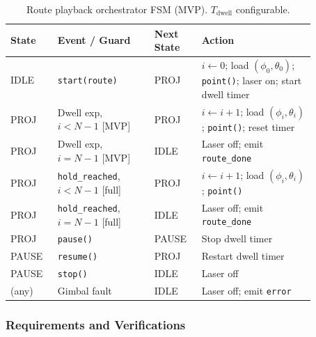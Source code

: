 \documentclass[12pt]{extarticle}
\begin{document}
\begin{table}[H]
\small\centering
\begin{tabular}{>{\raggedright}p{0.13\linewidth}
                >{\raggedright}p{0.28\linewidth}
                >{\raggedright}p{0.13\linewidth}
                >{\raggedright\arraybackslash}p{0.33\linewidth}}
\toprule
\textbf{State} & \textbf{Event / Guard} & \textbf{Next State} & \textbf{Action} \\
\midrule
IDLE  & \texttt{start(route)}                               & PROJ  & $i \leftarrow 0$; load $(\phi_0,\theta_0)$; \texttt{point()}; laser on; start dwell timer \\
PROJ  & Dwell exp, $i < N-1$ \textsf{[MVP]}                & PROJ  & $i \leftarrow i+1$; load $(\phi_i,\theta_i)$; \texttt{point()}; reset timer \\
PROJ  & Dwell exp, $i = N-1$ \textsf{[MVP]}                & IDLE  & Laser off; emit \texttt{route\_done} \\
PROJ  & \texttt{hold\_reached}, $i < N-1$ \textsf{[full]}  & PROJ  & $i \leftarrow i+1$; load $(\phi_i,\theta_i)$; \texttt{point()} \\
PROJ  & \texttt{hold\_reached}, $i = N-1$ \textsf{[full]}  & IDLE  & Laser off; emit \texttt{route\_done} \\
PROJ  & \texttt{pause()}                                    & PAUSE & Stop dwell timer \\
PAUSE & \texttt{resume()}                                   & PROJ  & Restart dwell timer \\
PAUSE & \texttt{stop()}                                     & IDLE  & Laser off \\
(any) & Gimbal fault                                        & IDLE  & Laser off; emit \texttt{error} \\
\bottomrule
\end{tabular}
\caption{Route playback orchestrator FSM (MVP). $T_\text{dwell}$ configurable.}
\label{tab:fsm-playback}
\end{table}

\subsubsection{Requirements and Verifications}
\end{document}
